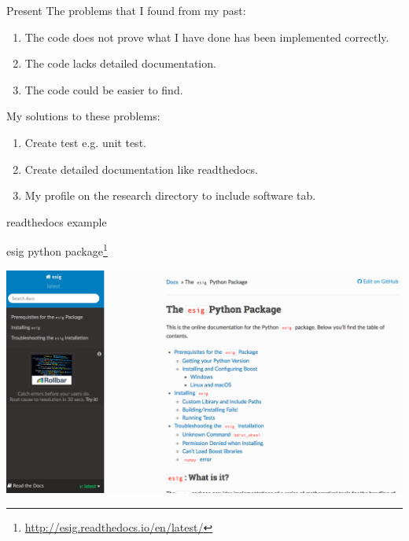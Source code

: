 \documentclass[10pt]{beamer}
\begin{document}
\begin{frame}{Present}
The problems that I found from my past:
\begin{enumerate}
\item The code does not prove what I have done has been implemented correctly.
\item The code lacks detailed documentation.
\item The code could be easier to find.
\end{enumerate}
My solutions to these problems:
\begin{enumerate}
\item Create test e.g. unit test.
\item Create detailed documentation like readthedocs.
\item My profile on the research directory to include software tab.
\end{enumerate}
\end{frame}

\begin{frame}{readthedocs example}
\begin{block}{esig python package\footnote{\url{http://esig.readthedocs.io/en/latest/}}}
\begin{center}
\includegraphics[scale=0.25]{esig.png}
\end{center}
\end{block}

\end{frame}
\end{document}

